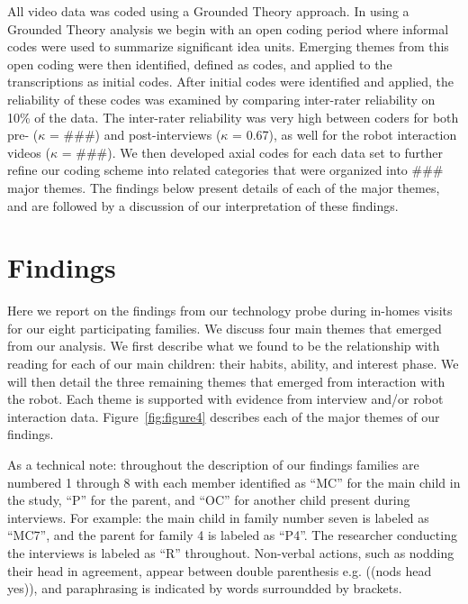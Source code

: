 \documentclass{sigchi}
\begin{document}
  All video data was coded using a Grounded Theory \cite{Glaser:1967,Charmaz:2012}approach. In using a Grounded Theory analysis we begin with an open coding period where informal codes were used to summarize significant idea units.  Emerging themes from this open coding were then identified, defined as codes, and applied to the transcriptions as initial codes. After initial codes were identified and applied, the reliability of these codes was examined by comparing inter-rater reliability on 10\% of the data. The inter-rater reliability was very high between coders for both pre- ($\kappa$ = \#\#\#) and post-interviews ($\kappa$ = 0.67), as well for the robot interaction videos ($\kappa$ = \#\#\#). We then developed axial codes for each data set to further refine our coding scheme into related categories that were organized into \#\#\# major themes. The findings below present details of each of the major themes, and are followed by a discussion of our interpretation of these findings.
 
\section{Findings}
Here we report on the findings from our technology probe during in-homes visits for our eight participating families. We discuss four main themes that emerged from our analysis. We first describe what we found to be the relationship with reading for each of our main children: their habits, ability, and interest phase. We will then detail the three remaining themes that emerged from interaction with the robot. Each theme is supported with evidence from interview and/or robot interaction data. Figure~\ref{fig:figure4} describes each of the major themes of our findings. 

As a technical note: throughout the description of our findings families are numbered 1 through 8 with each member identified as ``MC'' for the main child in the study, ``P'' for the parent, and ``OC'' for another child present during interviews. For example: the main child in family number seven is labeled as ``MC7'', and the parent for family 4 is labeled as ``P4''. The researcher conducting the interviews is labeled as ``R'' throughout. Non-verbal actions, such as nodding their head in agreement, appear between double parenthesis e.g. ((nods head yes)), and paraphrasing is indicated by words surroundded by brackets.
\end{document}
